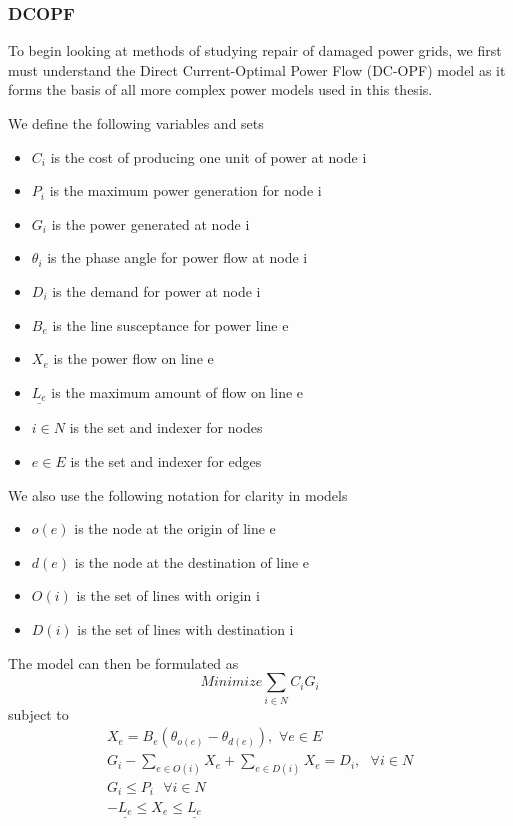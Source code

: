 \documentclass{article}
\begin{document}
	\subsubsection{DCOPF}
		To begin looking at methods of studying repair of damaged power grids, we first must understand the Direct Current-Optimal Power Flow (DC-OPF) model as it forms the basis of all more complex power models used in this thesis.
		
	We define the following variables and sets
	\begin{itemize}
		\item $C_i$ is the cost of producing one unit of power at node i
		\item $P_i$ is the maximum power generation for node i
		\item $G_i$ is the power generated at node i
		\item $\theta_i$ is the phase angle for power flow at node i 
		\item $D_i$ is the demand for power at node i
		\item $B_e$ is the line susceptance for power line e
		\item $X_e$ is the power flow on line e
		\item $\underline{L_e}$ is the maximum amount of flow on line e
		\item $i \in N$ is the set and indexer for nodes
		\item $e \in E$ is the set and indexer for edges
	\end{itemize}
	We also use the following notation for clarity in models
	\begin{itemize}
		\item $o(e)$ is the node at the origin of line e
		\item $d(e)$ is the node at the destination of line e
		\item $O(i)$ is the set of lines with origin i
		\item $D(i)$ is the set of lines with destination i
	\end{itemize}
	The model can then be formulated as 
	\begin{equation}
Minimize \sum_{i\in N} C_i G_i
	\end{equation} 
	subject to
	\begin{eqnarray}
	X_e = B_e (\theta_{o(e)} - \theta_{d(e)}), \hspace{4pt} \forall e \in E\\
	G_i - \sum_{e \in O(i)} X_e + \sum_{e \in D(i)} X_e = D_i, \hspace{4pt} \hspace{4pt} \forall i \in N\\
	  G_i \leq P_{i} \hspace{4pt} \hspace{4pt} \forall i \in N	\\ 
	  -\underline{L_e} \leq X_e \leq \underline{L_e}
\end{eqnarray}
\end{document}
